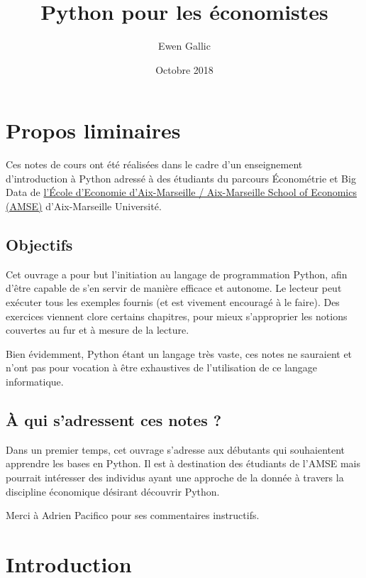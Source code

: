 \documentclass[12pt,]{book}
\title{Python pour les économistes}
\author{Ewen Gallic}
\date{Octobre 2018}
\numberwithin{equation}{section}
\numberwithin{countremarque}{section}
\newcounter{exercices}[section]
\begin{document}
\maketitle

{
\hypersetup{linkcolor=black}
\setcounter{tocdepth}{3}
\tableofcontents
}
\listoftables
\listoffigures
\chapter*{Propos liminaires}\label{propos-liminaires}

Ces notes de cours ont été réalisées dans le cadre d'un enseignement
d'introduction à Python adressé à des étudiants du parcours Économétrie
et Big Data de \href{https://www.amse-aixmarseille.fr/}{l'École
d'Economie d'Aix-Marseille / Aix-Marseille School of Economics (AMSE)}
d'Aix-Marseille Université.

\section{Objectifs}\label{objectifs}

Cet ouvrage a pour but l'initiation au langage de programmation Python,
afin d'être capable de s'en servir de manière efficace et autonome. Le
lecteur peut exécuter tous les exemples fournis (et est vivement
encouragé à le faire). Des exercices viennent clore certains chapitres,
pour mieux s'approprier les notions couvertes au fur et à mesure de la
lecture.

Bien évidemment, Python étant un langage très vaste, ces notes ne
sauraient et n'ont pas pour vocation à être exhaustives de l'utilisation
de ce langage informatique.

\section{À qui s'adressent ces notes
?}\label{a-qui-sadressent-ces-notes}

Dans un premier temps, cet ouvrage s'adresse aux débutants qui
souhaientent apprendre les bases en Python. Il est à destination des
étudiants de l'AMSE mais pourrait intéresser des individus ayant une
approche de la donnée à travers la discipline économique désirant
découvrir Python.

Merci à Adrien Pacifico pour ses commentaires instructifs.

\chapter{Introduction}\label{introduction}
\end{document}
